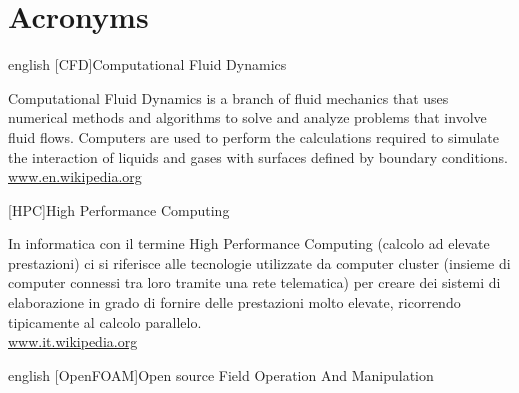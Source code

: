 %
%
\cleardoublepage
%
\chapter{Acronyms}
%
%
\begin{acronym}[OpenFOAM]	%
%
%
%
%
\begin{otherlanguage*}{english}
%
[CFD]{Computational Fluid Dynamics}

{\smaller Computational Fluid Dynamics is a branch of fluid mechanics that uses numerical methods and algorithms to solve and analyze problems that involve fluid flows. Computers are used to perform the calculations required to simulate the interaction of liquids and gases with surfaces defined by boundary conditions.\\
\href{http://en.wikipedia.org/wiki/Computational_fluid_dynamics}{www.en.wikipedia.org}
\par}
%
\end{otherlanguage*}
%
%
[HPC]{High Performance Computing}

{\smaller In informatica con il termine High Performance Computing (calcolo ad elevate prestazioni) ci si riferisce alle tecnologie utilizzate da computer cluster (insieme di computer connessi tra loro tramite una rete telematica) per creare dei sistemi di elaborazione in grado di fornire delle prestazioni molto elevate, ricorrendo tipicamente al calcolo parallelo.\\
\href{http://it.wikipedia.org/wiki/High_Performance_Computing}{www.it.wikipedia.org}
\par}
%
%
\begin{otherlanguage*}{english}
%
[OpenFOAM]{Open source Field Operation And Manipulation}


\end{otherlanguage*}
\end{acronym}
